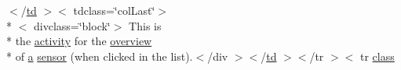 \begin{DoxyCompactItemize}
$<$/\hyperlink{stylesheet_8css_a2635d454965afd759ce151c6f6d1a04a}{td} $>$$<$ tdclass=\char`\"{}col\-Last\char`\"{}$>$\\*
$<$ divclass=\char`\"{}block\char`\"{}$>$ This is \\*
the \hyperlink{_sensor_activity_8html_a27ce96cb0fb53311961cb30579c7f77e}{activity} for the \hyperlink{_sensor_overview_activity_8html_a8a9eb4928f27f52b33c3510380ee5501}{overview} \\*
of \hyperlink{style_8css_a5e8981582017bb8b84c21f148345d1f7}{a} \hyperlink{com_2cloudia_2cloudia__android_2package-summary_8html_a6b8e822b5719994bc951c30615879a2a}{sensor} (when clicked in the list).$<$/div $>$$<$/\hyperlink{stylesheet_8css_a2635d454965afd759ce151c6f6d1a04a}{td} $>$$<$/tr $>$$<$ tr \hyperlink{_tools_8html_acf06f836132665ba8114f5a414c2403f}{class}
\end{DoxyCompactItemize}
